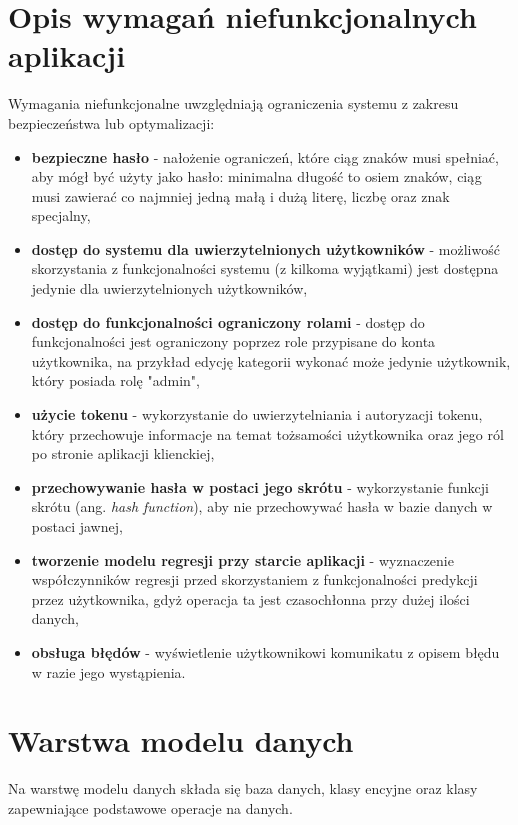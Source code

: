 \section{Opis wymagań niefunkcjonalnych aplikacji}
Wymagania niefunkcjonalne uwzględniają ograniczenia systemu z zakresu bezpieczeństwa lub optymalizacji:
\begin{itemize}
	\item\textbf{bezpieczne hasło} - nałożenie ograniczeń, które ciąg znaków musi spełniać, aby mógł być użyty jako hasło: minimalna długość to osiem znaków, ciąg musi zawierać co najmniej jedną małą i dużą literę, liczbę oraz znak specjalny,
	\item\textbf{dostęp do systemu dla uwierzytelnionych użytkowników} - możliwość skorzystania z funkcjonalności systemu (z kilkoma wyjątkami) jest dostępna jedynie dla uwierzytelnionych użytkowników,
	\item\textbf{dostęp do funkcjonalności ograniczony rolami} - dostęp do funkcjonalności jest ograniczony poprzez role przypisane do konta użytkownika, na przykład edycję kategorii wykonać może jedynie użytkownik, który posiada rolę "admin",
	\item\textbf{użycie tokenu} - wykorzystanie do uwierzytelniania i autoryzacji tokenu, który przechowuje informacje na temat tożsamości użytkownika oraz jego ról po stronie aplikacji klienckiej,
	\item\textbf{przechowywanie hasła w postaci jego skrótu} - wykorzystanie funkcji skrótu (ang. \textit{hash function}), aby nie przechowywać hasła w bazie danych w postaci jawnej,
	\item\textbf{tworzenie modelu regresji przy starcie aplikacji} - wyznaczenie współczynników regresji przed skorzystaniem z funkcjonalności predykcji przez użytkownika, gdyż operacja ta jest czasochłonna przy dużej ilości danych,
	\item\textbf{obsługa błędów} - wyświetlenie użytkownikowi komunikatu z opisem błędu w razie jego wystąpienia.
\end{itemize}
\section{Warstwa modelu danych}
Na warstwę modelu danych składa się baza danych, klasy encyjne oraz klasy zapewniające podstawowe operacje na danych.

